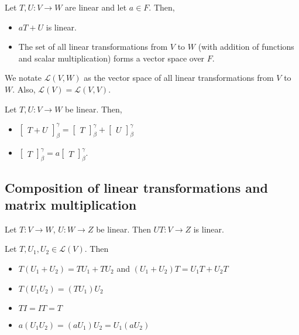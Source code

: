 \documentclass[12pt]{article}
\newenvironment{theorem}[2][Theorem]{\begin{trivlist}
\item[\hskip \labelsep {\bfseries #1}\hskip \labelsep {\bfseries #2.}]}{\end{trivlist}}
\begin{document}
\begin{theorem}{2.7}
Let $T,U : V \to W$ are linear and let $a \in F$. Then,

\begin{itemize}
    \item $aT + U$ is linear.
    \item The set of all linear transformations from $V$ to $W$ (with addition of functions and scalar multiplication) forms a vector space over $F$.
\end{itemize}
\end{theorem}

\noindent We notate $\mathcal{L}(V,W)$ as the vector space of all linear transformations from $V$ to $W$. Also, $\mathcal{L}(V) = \mathcal{L}(V,V)$.

\begin{theorem}{2.8}
Let $T,U : V \to W$ be linear. Then,

\begin{itemize}
    \item $\begin{bmatrix} T+U \end{bmatrix}_\beta^\gamma = \begin{bmatrix} T \end{bmatrix}_\beta^\gamma + \begin{bmatrix} U \end{bmatrix}_\beta^\gamma$
    \item $\begin{bmatrix} T \end{bmatrix}_\beta^\gamma = a\begin{bmatrix} T \end{bmatrix}_\beta^\gamma$.
\end{itemize}
\end{theorem}

\subsection{Composition of linear transformations and matrix multiplication}

\begin{theorem}{2.9}
Let $T : V \to W$, $U : W \to Z$ be linear. Then $UT : V \to Z$ is linear.
\end{theorem}

\begin{theorem}{2.10}
Let $T, U_1, U_2 \in \mathcal{L}(V)$. Then 

\begin{itemize}
    \item $T(U_1 + U_2) = TU_1 + TU_2$ and $(U_1 + U_2)T = U_1T + U_2T$
    \item $T(U_1U_2) = (TU_1)U_2$
    \item $TI = IT = T$
    \item $a(U_1U_2) = (aU_1)U_2 = U_1(aU_2)$
\end{itemize}
\end{theorem}
\end{document}
